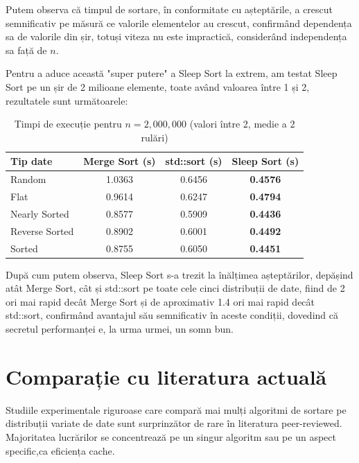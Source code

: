 \documentclass[9pt,a4paper,twocolumn,twoside]{rho-class/rho}
\begin{document}
        \par Putem observa că timpul de sortare, în conformitate cu așteptările, a crescut semnificativ pe măsură ce valorile elementelor au crescut, confirmând dependența sa de valorile din șir, totuși viteza nu este impractică, considerând independența sa față de $n$.
    \par Pentru a aduce această "super putere" a Sleep Sort la extrem, am testat Sleep Sort pe un șir de 2 milioane elemente, toate având valoarea între 1 și 2, rezultatele sunt următoarele:

    \begin{table}[h]
\centering
\caption{Timpi de execuție pentru $n = 2{,}000{,}000$ (valori între 2, medie a 2 rulări)}
\begin{tabular}{lccc}
\toprule
\textbf{Tip date} & \textbf{Merge Sort (s)} & \textbf{std::sort (s)} & \textbf{Sleep Sort (s)} \\
\midrule
Random        & 1.0363 & 0.6456 & \textbf{0.4576} \\
Flat          & 0.9614 & 0.6247 & \textbf{0.4794} \\
Nearly Sorted & 0.8577 & 0.5909 & \textbf{0.4436} \\
Reverse Sorted& 0.8902 & 0.6001 & \textbf{0.4492} \\
Sorted        & 0.8755 & 0.6050 & \textbf{0.4451} \\
\bottomrule
\end{tabular}
\label{tab:sleep_sort_wins}
\end{table}

    \par După cum putem observa, Sleep Sort s-a trezit la înălțimea așteptărilor, depășind atât Merge Sort, cât și std::sort pe toate cele cinci distribuții de date, fiind de 2 ori mai rapid decât Merge Sort și de aproximativ 1.4 ori mai rapid decât std::sort, confirmând avantajul său semnificativ în aceste condiții, dovedind că secretul performanței e, la urma urmei, un somn bun.



\section{Comparație cu literatura actuală}

\par Studiile experimentale riguroase care compară mai mulți algoritmi 
de sortare pe distribuții variate de date sunt surprinzător de rare 
în literatura peer-reviewed. Majoritatea lucrărilor se concentrează 
pe un singur algoritm sau pe un aspect specific,ca eficiența cache.
\end{document}
